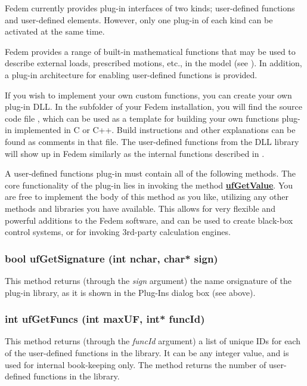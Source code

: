 Fedem currently provides plug-in interfaces of two kinds; user-defined functions
and user-defined elements. However, only one plug-in of each kind can be
activated at the same time.



Fedem provides a range of built-in mathematical functions that may be
used to describe external loads, prescribed motions, etc., in the model
(see ).
In addition, a plug-in architecture for enabling user-defined functions
is provided.

If you wish to implement your own custom functions, you can create your
own plug-in DLL. In the  subfolder of your Fedem installation,
you will find the source code file , which can be used as
a template for building your own functions plug-in implemented in C or C++.
Build instructions and other explanations can be found as comments in that file.
The user-defined functions from the DLL library will show up in Fedem similarly
as the internal functions described in .

A user-defined functions plug-in must contain all of the following methods.
The core functionality of the plug-in lies in invoking the method
\protect\hyperlink{ufgetvalue}{\bf ufGetValue}.
You are free to implement the body of this method as you like,
utilizing any other methods and libraries you have available.
This allows for very flexible and powerful additions to the Fedem software,
and can be used to create black-box control systems, or for invoking 3rd-party
calculation engines.

\subsubsection{bool ufGetSignature (int nchar, char* sign)}

This method returns (through the {\sl sign} argument) the name orsignature
of the plug-in library, as it is shown in the Plug-Ins dialog box (see above).

\subsubsection{int ufGetFuncs (int maxUF, int* funcId)}

This method returns (through the {\sl funcId} argument) a list of unique IDs
for each of the user-defined functions in the library.
It can be any integer value, and is used for internal book-keeping only.
The method returns the number of user-defined functions in the library.

